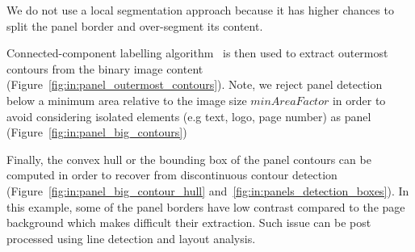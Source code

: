 
We do not use a local segmentation approach because it has higher chances to split the panel border and over-segment its content.

Connected-component labelling algorithm~\cite{Szeliski2010Computer} is then used to extract outermost contours from the binary image content (Figure~\ref{fig:in:panel_outermost_contours}).
Note, we reject panel detection below a minimum area relative to the image size $minAreaFactor$ in order to avoid considering isolated elements (e.g text, logo, page number) as panel (Figure~\ref{fig:in:panel_big_contours})

Finally, the convex hull or the bounding box of the panel contours can be computed in order to recover from discontinuous contour detection (Figure~\ref{fig:in:panel_big_contour_hull} and~\ref{fig:in:panels_detection_boxes}).
In this example, some of the panel borders have low contrast compared to the page background which makes difficult their extraction.
Such issue can be post processed using line detection and layout analysis.





